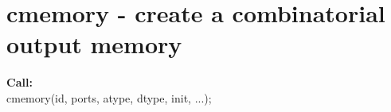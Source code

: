 %        
%        
%        
%        
%        
%        
%        


    \section{cmemory - create a combinatorial output memory}\label{sec:ipcmemory}
        
        {\bf Call:} \\
        cmemory(id, ports, atype, dtype, init, ...);
        
